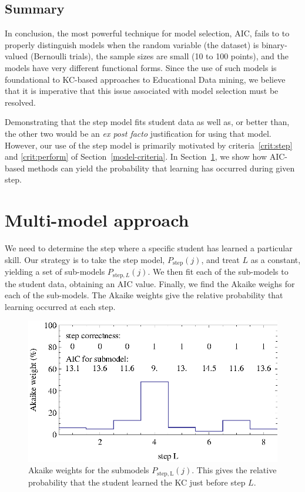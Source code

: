 \documentclass{acmlarge-edm}
\begin{document}
\subsection{Summary}

In conclusion, the most powerful technique for model selection,
AIC, fails to to properly distinguish models when the random
variable (the dataset) is binary-valued (Bernoulli trials),
the sample sizes are small (10 to 100 points), and the models
have very different functional forms.  Since the use of such
models is foundational to KC-based approaches to Educational
Data mining, we believe that it is imperative that this issue 
associated with model selection must be resolved.

Demonstrating that the step model fits student data as well as,
or better than, the other two would be an
{\em ex post facto} justification for using that model.  
However, our use of the step model is primarily motivated
by criteria~\ref{crit:step} and \ref{crit:perform} of 
Section~\ref{model-criteria}.
In Section~\ref{multi-model}, we show how AIC-based methods
can yield the probability that learning has occurred during given step.

\section{Multi-model approach}
\label{multi-model}

We need to determine the step where a specific student has learned a
particular skill.  Our strategy is to take the step model, 
$P_\mathrm{step}(j)$, and treat $L$ as a constant, yielding a set of 
sub-models $P_{\mathrm{step},L}(j)$.
We then fit each of the sub-models to the student data, obtaining an
AIC value.  Finally, we find the Akaike weighs for each of the
sub-models.  The Akaike weights give the relative probability that learning
occurred at each step.

\begin{figure}
  \centering \includegraphics{step-weights.eps}
   \caption{Akaike weights for the submodels $P_\mathrm{step,L}(j)$.  
     This gives the relative probability that
      the student learned the KC just before step $L$.}
    \label{step-weights}
\end{figure}
\end{document}
